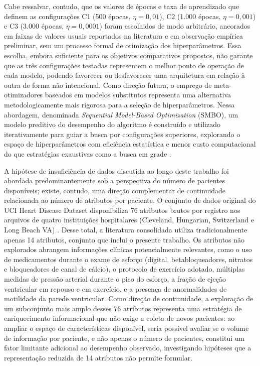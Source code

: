Cabe ressalvar, contudo, que os valores de épocas e taxa de aprendizado que definem as configurações C1 (500 épocas, $\eta = 0{,}01$), C2 (1.000 épocas, $\eta = 0{,}001$) e C3 (3.000 épocas, $\eta = 0{,}0001$) foram escolhidos de modo arbitrário, ancorados em faixas de valores usuais reportados na literatura e em observação empírica preliminar, sem um processo formal de otimização dos hiperparâmetros. Essa escolha, embora suficiente para os objetivos comparativos propostos, não garante que as três configurações testadas representem o melhor ponto de operação de cada modelo, podendo favorecer ou desfavorecer uma arquitetura em relação à outra de forma não intencional. Como direção futura, o emprego de meta-otimizadores baseados em modelos substitutos representa uma alternativa metodologicamente mais rigorosa para a seleção de hiperparâmetros. Nessa abordagem, denominada \textit{Sequential Model-Based Optimization} (SMBO), um modelo preditivo do desempenho do algoritmo é construído e utilizado iterativamente para guiar a busca por configurações superiores, explorando o espaço de hiperparâmetros com eficiência estatística e menor custo computacional do que estratégias exaustivas como a busca em grade \cite{trindade2019}.

A hipótese de insuficiência de dados discutida ao longo deste trabalho foi abordada predominantemente sob a perspectiva do número de pacientes disponíveis; existe, contudo, uma direção complementar de continuidade relacionada ao número de atributos por paciente. O conjunto de dados original do UCI Heart Disease Dataset disponibiliza 76 atributos brutos por registro nos arquivos de quatro instituições hospitalares (Cleveland, Hungarian, Switzerland e Long Beach VA) \cite{janosi1989}. Desse total, a literatura consolidada utiliza tradicionalmente apenas 14 atributos, conjunto que inclui o presente trabalho. Os atributos não explorados abrangem informações clínicas potencialmente relevantes, como o uso de medicamentos durante o exame de esforço (digital, betabloqueadores, nitratos e bloqueadores de canal de cálcio), o protocolo de exercício adotado, múltiplas medidas de pressão arterial durante o pico do esforço, a fração de ejeção ventricular em repouso e em exercício, e a presença de anormalidades de motilidade da parede ventricular. Como direção de continuidade, a exploração de um subconjunto mais amplo desses 76 atributos representa uma estratégia de enriquecimento informacional que não exige a coleta de novos pacientes: ao ampliar o espaço de características disponível, seria possível avaliar se o volume de informação por paciente, e não apenas o número de pacientes, constitui um fator limitante adicional ao desempenho observado, investigando hipóteses que a representação reduzida de 14 atributos não permite formular.


